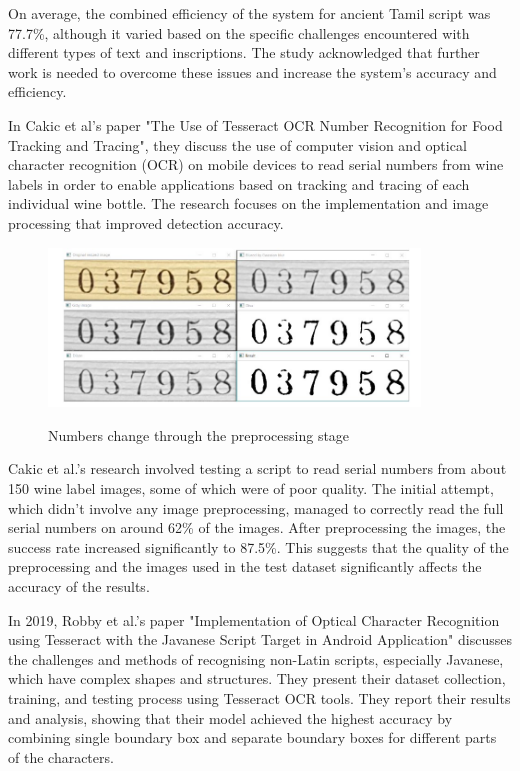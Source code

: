 On average, the combined efficiency of the system for ancient Tamil script was 77.7\%, although it varied based on the specific challenges encountered with different types of text and inscriptions. The study acknowledged that further work is needed to overcome these issues and increase the system's accuracy and efficiency.\cite{giridharNovelApproachOCR2019}

In Cakic et al's paper "The Use of Tesseract OCR Number Recognition for Food Tracking and Tracing", they discuss the use of computer vision and optical character recognition (OCR) on mobile devices to read serial numbers from wine labels in order to enable applications based on tracking and tracing of each individual wine bottle. The research focuses on the implementation and image processing that improved detection accuracy.

\begin{figure}[ht]
    \centering
    \includegraphics[width=0.88\textwidth]{Figures/tesseract_papers/Cakic_2020.jpg}
    \caption[Numbers change through the preprocessing stage]{Numbers change through the preprocessing stage}\cite{cakicUseTesseractOCR2020}
    \label{fig:Cakic's Numbers change through the preprocessing stage}
\end{figure}

Cakic et al.'s research involved testing a script to read serial numbers from about 150 wine label images, some of which were of poor quality. The initial attempt, which didn't involve any image preprocessing, managed to correctly read the full serial numbers on around 62\% of the images. After preprocessing the images, the success rate increased significantly to 87.5\%. This suggests that the quality of the preprocessing and the images used in the test dataset significantly affects the accuracy of the results.

In 2019, Robby et al.'s paper "Implementation of Optical Character Recognition using Tesseract with the Javanese Script Target in Android Application" discusses the challenges and methods of recognising non-Latin scripts, especially Javanese, which have complex shapes and structures. They present their dataset collection, training, and testing process using Tesseract OCR tools. They report their results and analysis, showing that their model achieved the highest accuracy by combining single boundary box and separate boundary boxes for different parts of the characters.

